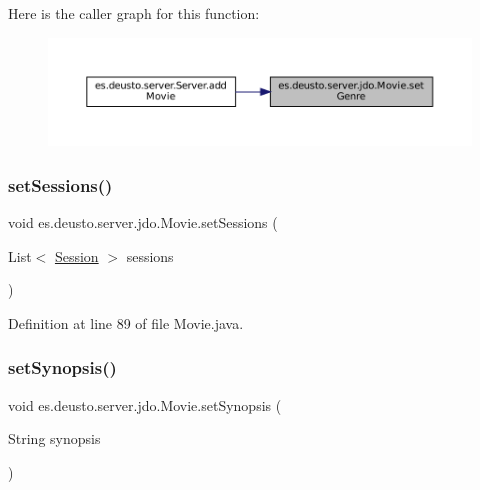 Here is the caller graph for this function\+:
\nopagebreak
\begin{figure}[H]
\begin{center}
\leavevmode
\includegraphics[width=350pt]{classes_1_1deusto_1_1server_1_1jdo_1_1_movie_aae8757b5e3229b6b521a0b8dab606eff_icgraph}
\end{center}
\end{figure}
\mbox{\label{classes_1_1deusto_1_1server_1_1jdo_1_1_movie_a76eb3668db335d824abc947053584699}} 
\subsubsection{\texorpdfstring{setSessions()}{setSessions()}}
{\footnotesize\ttfamily void es.\+deusto.\+server.\+jdo.\+Movie.\+set\+Sessions (\begin{DoxyParamCaption}\item[{List$<$ \mbox{\hyperlink{classes_1_1deusto_1_1server_1_1jdo_1_1_session}{Session}} $>$}]{sessions }\end{DoxyParamCaption})}



Definition at line 89 of file Movie.\+java.

\mbox{\label{classes_1_1deusto_1_1server_1_1jdo_1_1_movie_a8bc588baca5c14a900a83d8a0326542c}} 
\subsubsection{\texorpdfstring{setSynopsis()}{setSynopsis()}}
{\footnotesize\ttfamily void es.\+deusto.\+server.\+jdo.\+Movie.\+set\+Synopsis (\begin{DoxyParamCaption}\item[{String}]{synopsis }\end{DoxyParamCaption})}



